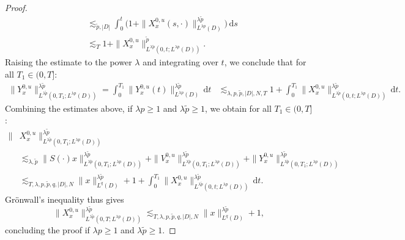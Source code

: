 \documentclass{amsart}
\theoremstyle{plain}
\theoremstyle{remark}
\theoremstyle{plain}
\numberwithin{equation}{section}
\newcommand{\dd}{\,\mathrm{d}}
\begin{document}
\begin{proof}
\begin{align*}
  &\lesssim_{\tilde p,|D|} \int_0^t \big(1+\|X_x^{0,u}(s,\cdot)\|_{L^{\lambda p}(D)}^{\lambda \tilde p}\big)\dd s\\
  &\lesssim_{T } 1 +  \|X_x^{0,u}\|_{L^{\lambda\tilde p}(0,t; L^{\lambda p}(D))}^{  \tilde p}.
\end{align*}  
Raising the estimate to the power $\lambda$ and integrating over $t$, we conclude that for all $T_1\in(0,T]$:
\begin{align*}
\|Y_x^{0,u}\|_{L^{\lambda\tilde p}(0,T_1;L^{\lambda p}(D))}^{\lambda\tilde p}
=\int_0^{T_1}\|Y_x^{0,u}(t)\|_{L^{\lambda p}(D)}^{\lambda\tilde p}\dd t
&\lesssim_{\lambda,p,\tilde p,|D|,N,T} 1+
\int_0^{T_1}\|X_x^{0,u}\|_{L^{\lambda\tilde p}(0,t;L^{\lambda p}(D))}^{\lambda\tilde p} \dd t.
\end{align*} 
Combining the estimates above, if $\lambda p\geq 1$ and $\lambda\tilde p\geq 1$, we obtain for all $T_1\in(0,T]$:  
\begin{align*}
  \|&X_x^{0,u}\|_{L^{\lambda\tilde p}(0,{T_1};L^{\lambda p}(D))}^{\lambda\tilde p}\\
  &\lesssim_{\lambda,\tilde p}\|S(\cdot)x\|_{L^{\lambda\tilde p}(0,{T_1};L^{\lambda p}(D))}^{\lambda\tilde p}
  +\|V_x^{0,u}\|_{L^{\lambda\tilde p}(0,{T_1};L^{\lambda p}(D))}^{\lambda\tilde p}+\|Y_x^{0,u}\|_{L^{\lambda\tilde p}(0,{T_1};L^{\lambda p}(D))}^{\lambda\tilde p}\\
  &\lesssim_{T,\lambda,p,\tilde p,q,|D|,N}\|x\|_{L^q(D)}^{\lambda\tilde p}+ 1+
\int_0^{T_1}\|X_x^{0,u}\|_{L^{\lambda\tilde p}(0,t;L^{\lambda p}(D))}^{\lambda\tilde p} \dd t.
\end{align*}
Gr\"onwall's inequality thus gives  
\[
 \|X_x^{0,u}\|_{L^{\lambda\tilde p}(0,T;L^{\lambda p}(D))}^{\lambda\tilde p} 
  \lesssim_{T,\lambda,p,\tilde p,q,|D|,N}\|x\|_{L^q(D)}^{\lambda\tilde p}+ 1,
\]
concluding the proof if $\lambda p\geq 1$ and $\lambda\tilde p\geq 1$. 


\end{proof}
\end{document}
